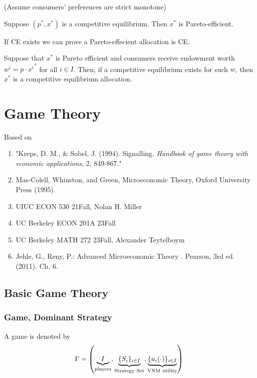 \documentclass[11pt]{elegantbook}
\begin{document}
(Assume consumers' preferences are strict monotone)
\begin{theorem}
    Suppose $(p^*,x^*)$ is a competitive equilibrium. Then $x^*$ is Pareto-efficient.
\end{theorem}

If CE exists we can prove a Pareto-effecient allocation is CE.
\begin{theorem}
    Suppose that $x^*$ is Pareto efficient and consumers receive endowment worth $w^i=p\cdot {x^i}^*$ for all $i\in I$. Then, if a competitive equilibrium exists for such $w$, then $x^*$ is a competitive equilibrium allocation.
\end{theorem}







\chapter{Game Theory}
Based on
\begin{enumerate}[$\circ$]
    \item "Kreps, D. M., \& Sobel, J. (1994). Signalling. \textit{Handbook of game theory with economic applications}, 2, 849-867."
    \item Mas-Colell, Whinston, and Green, Microeconomic Theory, Oxford University Press (1995).
    \item UIUC ECON 530 21Fall, Nolan H. Miller
    \item UC Berkeley ECON 201A 23Fall
    \item UC Berkeley MATH 272 23Fall, Alexander Teytelboym
    \item  Jehle, G., Reny, P.: Advanced Microeconomic Theory . Pearson, 3rd ed. (2011). Ch. 6.
\end{enumerate}



\section{Basic Game Theory}

\subsection{Game, Dominant Strategy}
A game is denoted by $$\Gamma =\left(\underbrace{I}_{\textnormal{players}},\underbrace{\{S_i\}_{i\in I}}_{\textnormal{Strategy Set}},\underbrace{\{u_i(\cdot)\}_{i\in I}}_{\textnormal{VNM utility}}\right)$$
\end{document}
